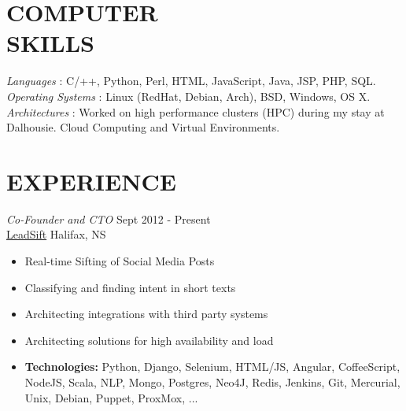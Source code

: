 \documentclass[line,margin]{res}
\begin{document}
\begin{resume}
\section{COMPUTER \\ SKILLS}
    {\sl Languages \hspace{35pt}}:
     C/++, Python, Perl, HTML, JavaScript, Java, JSP, PHP, SQL.\\
    {\sl Operating Systems }:
     Linux (RedHat, Debian, Arch), BSD, Windows, OS X. \\
    {\sl Architectures \hspace{27pt}}:
     Worked on high performance clusters (HPC) during my stay at \\
     \hspace*{92pt} Dalhousie. Cloud Computing and Virtual Environments.

\section{EXPERIENCE}

    {\sl Co-Founder and CTO} \hfill Sept 2012 - Present \\
    \href{http://www.leadsift.com}{LeadSift} \hfill Halifax, NS \smallskip
    \begin{itemize}  \itemsep -2pt %
     \item Real-time Sifting of Social Media Posts
     \item Classifying and finding intent in short texts
     \item Architecting integrations with third party systems
     \item Architecting solutions for high availability and load
     \item {\bf Technologies:} \hspace{1pt}
        Python, Django, Selenium, HTML/JS, Angular, CoffeeScript, \newline
        \hspace*{72pt} NodeJS, Scala, NLP, Mongo, Postgres, Neo4J, Redis, \newline
        \hspace*{72pt} Jenkins, Git, Mercurial, Unix, Debian, Puppet, ProxMox, ...
    \end{itemize}


\end{resume}
\end{document}
